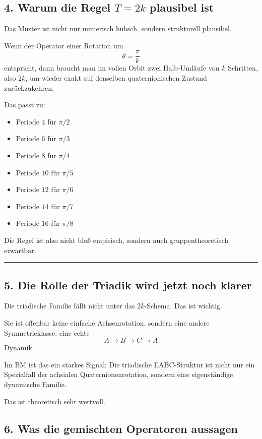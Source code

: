 \documentclass[11pt,a4paper]{article}
\theoremstyle{definition}
\begin{document}
	\subsection*{4. Warum die Regel $T=2k$ plausibel ist}
	
	Das Muster ist nicht nur numerisch hübsch, sondern strukturell plausibel.
	
	Wenn der Operator einer Rotation um
	\[
	\theta=\frac{\pi}{k}
	\]
	entspricht, dann braucht man im vollen Orbit zwei Halb-Umläufe von $k$ Schritten, also $2k$, um wieder exakt auf denselben quaternionischen Zustand zurückzukehren.
	
	Das passt zu:
	\begin{itemize}
		\item Periode $4$ für $\pi/2$
		\item Periode $6$ für $\pi/3$
		\item Periode $8$ für $\pi/4$
		\item Periode $10$ für $\pi/5$
		\item Periode $12$ für $\pi/6$
		\item Periode $14$ für $\pi/7$
		\item Periode $16$ für $\pi/8$
	\end{itemize}
	
	Die Regel ist also nicht bloß empirisch, sondern auch gruppentheoretisch erwartbar.
	
	\medskip\hrule\medskip
	
	\subsection*{5. Die Rolle der Triadik wird jetzt noch klarer}
	
	Die triadische Familie fällt nicht unter das $2k$-Schema. Das ist wichtig.
	
	Sie ist offenbar keine einfache Achsenrotation, sondern eine andere Symmetrieklasse: eine echte
	\[
	A\to B\to C\to A
	\]
	Dynamik.
	
	Im BM ist das ein starkes Signal: Die triadische EABC-Struktur ist nicht nur ein Spezialfall der achsialen Quaternionenrotation, sondern eine eigenständige dynamische Familie.
	
	Das ist theoretisch sehr wertvoll.
	
	\subsection*{6. Was die gemischten Operatoren aussagen}
	
\end{document}
